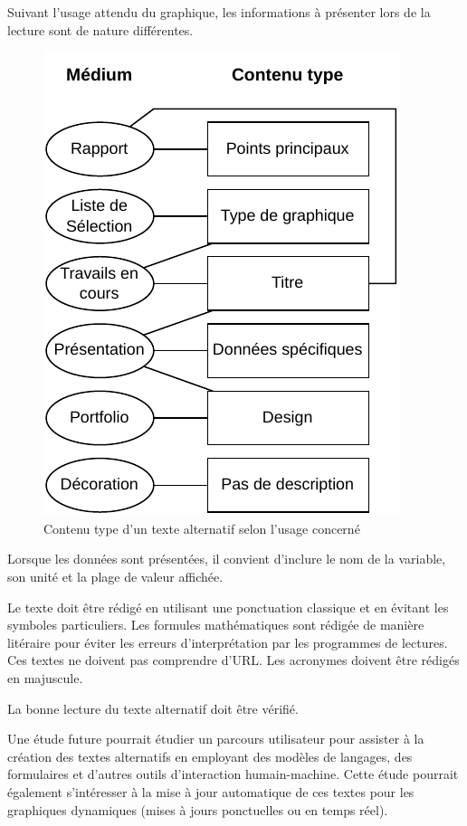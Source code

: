 \documentclass[a4paper,12pt]{article}
\begin{document}
\begin{multicols}{2}
Suivant l'usage attendu du graphique, les informations à présenter lors de la lecture sont de nature différentes.

\begin{figure}[H]
\centering
\includegraphics[width=.9\linewidth]{./img/alt-text.pdf}
\caption{\label{fig:org79643df}Contenu type d'un texte alternatif selon l'usage concerné}
\end{figure}

Lorsque les données sont présentées, il convient d'inclure le nom de la variable, son unité et la plage de valeur affichée.

Le texte doit être rédigé en utilisant une ponctuation classique et en évitant les symboles particuliers. Les formules mathématiques sont rédigée de manière litéraire pour éviter les erreurs d'interprétation par les programmes de lectures. Ces textes ne doivent pas comprendre d'URL. Les acronymes doivent être rédigés en majuscule.

La bonne lecture du texte alternatif doit être vérifié.

Une étude future pourrait étudier un parcours utilisateur pour assister à la création des textes alternatifs en employant des modèles de langages, des formulaires et d'autres outils d'interaction humain-machine. Cette étude pourrait également s'intéresser à la mise à jour automatique de ces textes pour les graphiques dynamiques  (mises à jours ponctuelles ou en temps réel).

\end{multicols}
\end{document}
